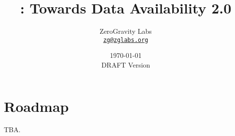 \documentclass[letterpaper,11pt]{article}
\title{\LARGE \project:
	\Large Towards Data Availability 2.0}
\author{
		ZeroGravity Labs\\
		\small\href{mailto:zg@zglabs.org}
			{\nolinkurl{zg@zglabs.org}}
	}
\date{\today\\\small DRAFT Version}
\begin{document}
\maketitle
\flushbottom %




\setcounter{tocdepth}{3}

\tableofcontents %

\thispagestyle{empty} %


\newpage













\section{Roadmap}

TBA.



\end{document}

